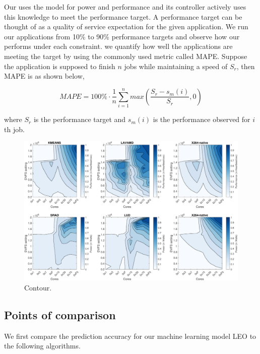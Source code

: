 Our \SYSTEM{} uses the model for power and performance and its controller actively uses this knowledge to meet the performance target. A performance target can be thought of as a quality of service expectation for the given application. We run our applications from 10\% to 90\% performance targets and observe how our \SYSTEM{} performs under each constraint. we quantify how well the applications are meeting the target by using the commonly used metric called MAPE. Suppose the application is supposed to finish $n$ jobs while maintaining a speed of $S_r$, then MAPE is as shown below,

\begin{equation}
MAPE = 100\% \cdot \frac{1}{n} \sum\limits_{i=1}^{n} max \left( \frac{S_{r} - s_m(i)}{S_r},0 \right)
\end{equation}

where $S_{r}$ is the performance target and $s_m(i)$ is the performance observed for $i$th job.

\begin{figure}
\centering
\includegraphics[scale=0.4]{figures/sample-contour3.png}

\caption{Contour.}
  \label{fig:contour}
\end{figure}
\subsection{Points of comparison}
We first compare the prediction accuracy for our machine learning model LEO to the following algorithms.


